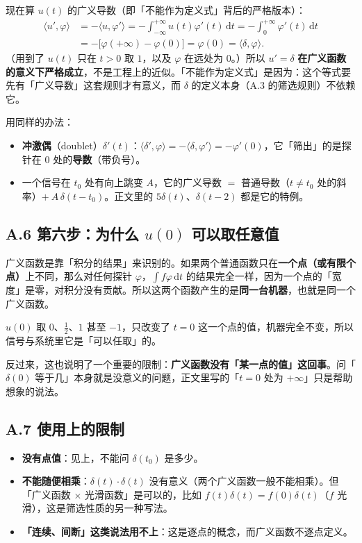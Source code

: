 \documentclass[UTF8,a4paper,11pt]{ctexart}
\renewcommand{\d}{\,\mathrm{d}}
\newcounter{ex}[section]
\begin{document}
现在算 $u(t)$ 的广义导数（即「不能作为定义式」背后的严格版本）：
\begin{align*}
\langle u',\varphi\rangle
&=-\langle u,\varphi'\rangle=-\int_{-\infty}^{+\infty}u(t)\varphi'(t)\d t
=-\int_{0}^{+\infty}\varphi'(t)\d t\\
&=-\bigl[\varphi(+\infty)-\varphi(0)\bigr]=\varphi(0)=\langle\delta,\varphi\rangle .
\end{align*}
（用到了 $u(t)$ 只在 $t>0$ 取 $1$，以及 $\varphi$ 在远处为 $0$。）所以 $u'=\delta$ \textbf{在广义函数的意义下严格成立}，不是工程上的近似。「不能作为定义式」是因为：这个等式要先有「广义导数」这套规则才有意义，而 $\delta$ 的定义本身（A.3 的筛选规则）不依赖它。

用同样的办法：
\begin{itemize}[nosep]
\item \textbf{冲激偶}（doublet）$\delta'(t)$：$\langle\delta',\varphi\rangle=-\langle\delta,\varphi'\rangle=-\varphi'(0)$，它「筛出」的是探针在 $0$ 处的\textbf{导数}（带负号）。
\item 一个信号在 $t_0$ 处有向上跳变 $A$，它的广义导数 $=$ 普通导数（$t\neq t_0$ 处的斜率）$+\ A\,\delta(t-t_0)$。正文里的 $5\delta(t)$、$\delta(t-2)$ 都是它的特例。
\end{itemize}

\subsection*{A.6 第六步：为什么 $u(0)$ 可以取任意值}
广义函数是靠「积分的结果」来识别的。如果两个普通函数只在\textbf{一个点（或有限个点）}上不同，那么对任何探针 $\varphi$，$\int f\varphi\d t$ 的结果完全一样，因为一个点的「宽度」是零，对积分没有贡献。所以这两个函数产生的是\textbf{同一台机器}，也就是同一个广义函数。

$u(0)$ 取 $0$、$\tfrac12$、$1$ 甚至 $-1$，只改变了 $t=0$ 这一个点的值，机器完全不变，所以信号与系统里它是「可以任取」的。

反过来，这也说明了一个重要的限制：\textbf{广义函数没有「某一点的值」这回事}。问「$\delta(0)$ 等于几」本身就是没意义的问题，正文里写的「$t=0$ 处为 $+\infty$」只是帮助想象的说法。

\subsection*{A.7 使用上的限制}
\begin{itemize}
\item \textbf{没有点值}：见上，不能问 $\delta(t_0)$ 是多少。
\item \textbf{不能随便相乘}：$\delta(t)\cdot\delta(t)$ 没有意义（两个广义函数一般不能相乘）。但「广义函数 $\times$ 光滑函数」是可以的，比如 $f(t)\delta(t)=f(0)\delta(t)$（$f$ 光滑），这是筛选性质的另一种写法。
\item \textbf{「连续、间断」这类说法用不上}：这是逐点的概念，而广义函数不逐点定义。
\end{itemize}
\end{document}

